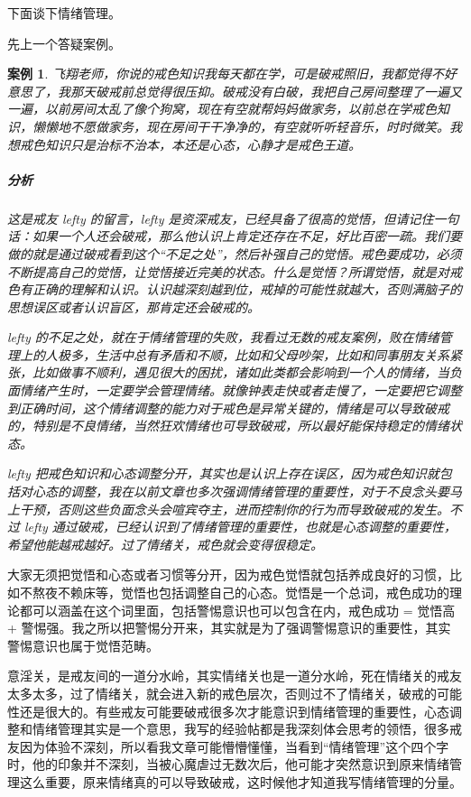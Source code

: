 \documentclass[fontset=founder]{ctexart}
\newtheorem{case}{案例}
\begin{document}
下面谈下情绪管理。

先上一个答疑案例。

\begin{case}
    飞翔老师，你说的戒色知识我每天都在学，可是破戒照旧，我都觉得不好意思了，我那天破戒前总觉得很压抑。破戒没有白破，我把自己房间整理了一遍又一遍，以前房间太乱了像个狗窝，现在有空就帮妈妈做家务，以前总在学戒色知识，懒懒地不愿做家务，现在房间干干净净的，有空就听听轻音乐，时时微笑。我想戒色知识只是治标不治本，本还是心态，心静才是戒色王道。
    \subparagraph{分析} 这是戒友 lefty 的留言，lefty 是资深戒友，已经具备了很高的觉悟，但请记住一句话：如果一个人还会破戒，那么他认识上肯定还存在不足，好比百密一疏。我们要做的就是通过破戒看到这个“不足之处”，然后补强自己的觉悟。戒色要成功，必须不断提高自己的觉悟，让觉悟接近完美的状态。什么是觉悟？所谓觉悟，就是对戒色有正确的理解和认识。认识越深刻越到位，戒掉的可能性就越大，否则满脑子的思想误区或者认识盲区，那肯定还会破戒的。

    lefty 的不足之处，就在于情绪管理的失败，我看过无数的戒友案例，败在情绪管理上的人极多，生活中总有矛盾和不顺，比如和父母吵架，比如和同事朋友关系紧张，比如做事不顺利，遇见很大的困扰，诸如此类都会影响到一个人的情绪，当负面情绪产生时，一定要学会管理情绪。就像钟表走快或者走慢了，一定要把它调整到正确时间，这个情绪调整的能力对于戒色是异常关键的，情绪是可以导致破戒的，特别是不良情绪，当然狂欢情绪也可导致破戒，所以最好能保持稳定的情绪状态。

    lefty 把戒色知识和心态调整分开，其实也是认识上存在误区，因为戒色知识就包括对心态的调整，我在以前文章也多次强调情绪管理的重要性，对于不良念头要马上干预，否则这些负面念头会喧宾夺主，进而控制你的行为而导致破戒的发生。不过 lefty 通过破戒，已经认识到了情绪管理的重要性，也就是心态调整的重要性，希望他能越戒越好。过了情绪关，戒色就会变得很稳定。
\end{case}

大家无须把觉悟和心态或者习惯等分开，因为戒色觉悟就包括养成良好的习惯，比如不熬夜不赖床等，觉悟也包括调整自己的心态。觉悟是一个总词，戒色成功的理论都可以涵盖在这个词里面，包括警惕意识也可以包含在内，戒色成功 = 觉悟高 + 警惕强。我之所以把警惕分开来，其实就是为了强调警惕意识的重要性，其实警惕意识也属于觉悟范畴。

意淫关，是戒友间的一道分水岭，其实情绪关也是一道分水岭，死在情绪关的戒友太多太多，过了情绪关，就会进入新的戒色层次，否则过不了情绪关，破戒的可能性还是很大的。有些戒友可能要破戒很多次才能意识到情绪管理的重要性，心态调整和情绪管理其实是一个意思，我写的经验帖都是我深刻体会思考的领悟，很多戒友因为体验不深刻，所以看我文章可能懵懵懂懂，当看到“情绪管理”这个四个字时，他的印象并不深刻，当被心魔虐过无数次后，他可能才突然意识到原来情绪管理这么重要，原来情绪真的可以导致破戒，这时候他才知道我写情绪管理的分量。
\end{document}

